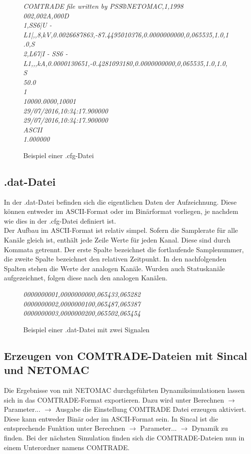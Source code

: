 \documentclass{scrartcl}
\begin{document}
\begin{onehalfspace}
\begin{figure}[H]
\textit{COMTRADE file written by PSS®NETOMAC,1,1998 \\
002,002A,000D \\
1,SS6|U - L1|,,8,kV,0.0026687863,-87.4495010376,0.0000000000,0,065535,1.0,1.0,S \\
2,L67|I - SS6 - L1,,,kA,0.0000130651,-0.4281093180,0.0000000000,0,065535,1.0,1.0,S \\
50.0 \\
1 \\
10000.0000,10001 \\
29/07/2016,10:34:17.900000 \\
29/07/2016,10:34:17.900000 \\
ASCII \\
1.000000}
\caption{Beispiel einer .cfg-Datei}
\label{bsp-cfg}
\end{figure}

\subsection{.dat-Datei}
In der .dat-Datei befinden sich die eigentlichen Daten der Aufzeichnung. Diese können entweder im ASCII-Format oder im Binärformat vorliegen, je nachdem wie dies in der .cfg-Datei definiert ist. \\
Der Aufbau im ASCII-Format ist relativ simpel. Sofern die Samplerate für alle Kanäle gleich ist, enthält jede Zeile Werte für jeden Kanal. Diese sind durch Kommata getrennt. Der erste Spalte bezeichnet die fortlaufende Samplenummer, die zweite Spalte bezeichnet den relativen Zeitpunkt. In den nachfolgenden Spalten stehen die Werte der analogen Kanäle. Wurden auch Statuskanäle aufgezeichnet, folgen diese nach den analogen Kanälen.

\begin{figure}[H]
\textit{0000000001,0000000000,065433,065282 \\
0000000002,0000000100,065487,065387 \\
0000000003,0000000200,065502,065454}
\caption{Beispiel einer .dat-Datei mit zwei Signalen}
\end{figure}

\subsection{Erzeugen von COMTRADE-Dateien mit Sincal und NETOMAC}
Die Ergebnisse von mit NETOMAC durchgeführten Dynamiksimulationen lassen sich in das COMTRADE-Format exportieren. Dazu wird unter Berechnen $\rightarrow$ Parameter... $\rightarrow$ Ausgabe die Einstellung \glqq COMTRADE Datei erzeugen\grqq{} aktiviert. Diese kann entweder Binär oder im ASCII-Format sein. In Sincal ist die entsprechende Funktion unter Berechnen $\rightarrow$ Parameter... $\rightarrow$ Dynamik zu finden. Bei der nächsten Simulation finden sich die COMTRADE-Dateien nun in einem Unterordner namens COMTRADE.


\end{onehalfspace}
\end{document}
